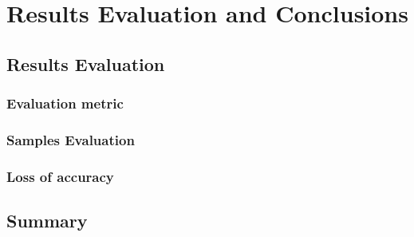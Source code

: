 \chapter{Results Evaluation and Conclusions}
\section{Results Evaluation}
\subsection{Evaluation metric}
\subsection{Samples Evaluation}
\subsection{Loss of accuracy}
\section{Summary}